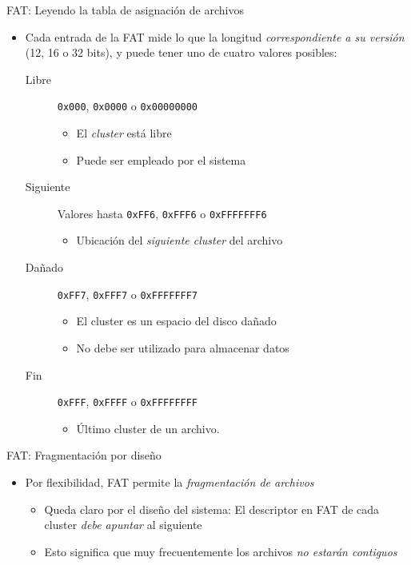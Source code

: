 \documentclass[presentation]{beamer}
\begin{document}
\begin{frame}[label={sec:orgeb69804},fragile]{FAT: Leyendo la tabla de asignación de archivos}
 \begin{itemize}
\item Cada entrada de la FAT mide lo que la longitud \emph{correspondiente a su
versión} (12, 16 o 32 bits), y puede tener uno de cuatro valores
posibles:
\begin{description}
\item[{Libre}] \texttt{0x000}, \texttt{0x0000} o \texttt{0x00000000}
\begin{itemize}
\item El \emph{cluster} está libre
\item Puede ser empleado por el sistema
\end{itemize}
\item[{Siguiente}] Valores hasta \texttt{0xFF6}, \texttt{0xFFF6} o \texttt{0xFFFFFFF6}
\begin{itemize}
\item Ubicación del \emph{siguiente cluster} del archivo
\end{itemize}
\item[{Dañado}] \texttt{0xFF7}, \texttt{0xFFF7} o \texttt{0xFFFFFFF7}
\begin{itemize}
\item El cluster es un espacio del disco dañado
\item No debe ser utilizado para almacenar datos
\end{itemize}
\item[{Fin}] \texttt{0xFFF}, \texttt{0xFFFF} o \texttt{0xFFFFFFFF}
\begin{itemize}
\item Último cluster de un archivo.
\end{itemize}
\end{description}
\end{itemize}
\end{frame}

\begin{frame}[label={sec:org5a317d4}]{FAT: Fragmentación por diseño}
\begin{itemize}
\item Por flexibilidad, FAT permite la \emph{fragmentación de archivos}
\begin{itemize}
\item Queda claro por el diseño del sistema: El descriptor en FAT de
cada cluster \emph{debe apuntar} al siguiente
\item Esto significa que muy frecuentemente los archivos \emph{no estarán
contiguos}
\end{itemize}
\end{itemize}
\end{frame}
\end{document}
